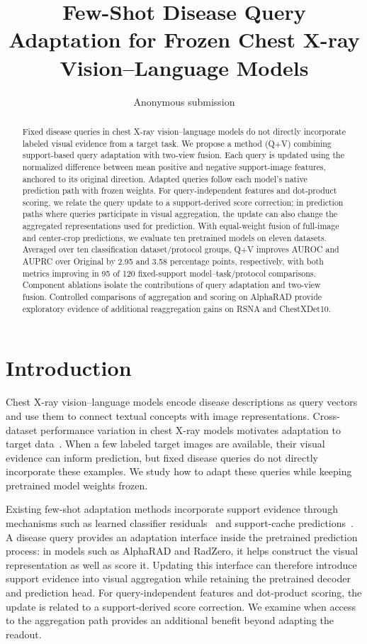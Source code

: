 \documentclass[10pt,twocolumn,letterpaper]{article}
\title{Few-Shot Disease Query Adaptation for Frozen Chest X-ray Vision--Language Models}
\author{Anonymous submission}
\begin{document}
\maketitle

\begin{abstract}
Fixed disease queries in chest X-ray vision--language models do not directly incorporate labeled visual evidence from a target task. We propose a method (Q+V) combining support-based query adaptation with two-view fusion. Each query is updated using the normalized difference between mean positive and negative support-image features, anchored to its original direction. Adapted queries follow each model's native prediction path with frozen weights. For query-independent features and dot-product scoring, we relate the query update to a support-derived score correction; in prediction paths where queries participate in visual aggregation, the update can also change the aggregated representations used for prediction. With equal-weight fusion of full-image and center-crop predictions, we evaluate ten pretrained models on eleven datasets. Averaged over ten classification dataset/protocol groups, Q+V improves AUROC and AUPRC over Original by 2.95 and 3.58 percentage points, respectively, with both metrics improving in 95 of 120 fixed-support model--task/protocol comparisons. Component ablations isolate the contributions of query adaptation and two-view fusion. Controlled comparisons of aggregation and scoring on AlphaRAD provide exploratory evidence of additional reaggregation gains on RSNA and ChestXDet10.
\end{abstract}

\section{Introduction}
\label{sec:intro}
Chest X-ray vision--language models encode disease descriptions as query vectors and use them to connect textual concepts with image representations. Cross-dataset performance variation in chest X-ray models motivates adaptation to target data~\cite{zech2018generalization}. When a few labeled target images are available, their visual evidence can inform prediction, but fixed disease queries do not directly incorporate these examples. We study how to adapt these queries while keeping pretrained model weights frozen.

Existing few-shot adaptation methods incorporate support evidence through mechanisms such as learned classifier residuals~\cite{taskres} and support-cache predictions~\cite{tipadapter}. A disease query provides an adaptation interface inside the pretrained prediction process: in models such as AlphaRAD and RadZero, it helps construct the visual representation as well as score it. Updating this interface can therefore introduce support evidence into visual aggregation while retaining the pretrained decoder and prediction head. For query-independent features and dot-product scoring, the update is related to a support-derived score correction. We examine when access to the aggregation path provides an additional benefit beyond adapting the readout.
\end{document}
